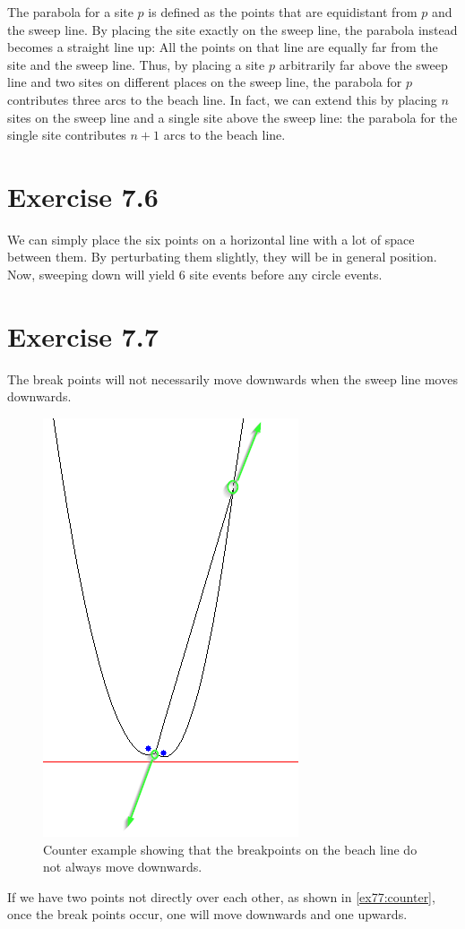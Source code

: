 \documentclass[11pt,a4paper]{article}
\begin{document}
The parabola for a site $p$ is defined as the points that are
equidistant from $p$ and the sweep line. By placing the site exactly
on the sweep line, the parabola instead becomes a straight line up:
All the points on that line are equally far from the site and the
sweep line. Thus, by placing a site $p$ arbitrarily far above the
sweep line and two sites on different places on the sweep line, the
parabola for $p$ contributes three arcs to the beach line. In fact, we
can extend this by placing $n$ sites on the sweep line and a single
site above the sweep line: the parabola for the single site
contributes $n+1$ arcs to the beach line.

\section{Exercise 7.6}

We can simply place the six points on a horizontal line with a lot of
space between them. By perturbating them slightly, they will be in
general position. Now, sweeping down will yield 6 site events before
any circle events.

\section{Exercise 7.7}

The break points will not necessarily move downwards when the sweep line moves
downwards.

\begin{figure}[h!]
    \centering
    \includegraphics{ex77-counter}
    \caption{Counter example showing that the breakpoints on the beach line do not always move downwards.}
    \label{ex77:counter}
\end{figure}

If we have two points not directly over each other, as shown in \autoref{ex77:counter}, once the break points
occur, one will move downwards and one upwards.
\end{document}
